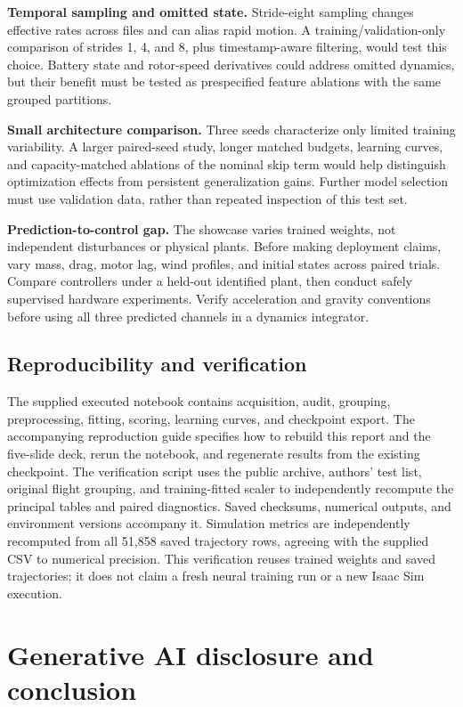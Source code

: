 \documentclass[10pt,letterpaper]{article}
\begin{document}
\textbf{Temporal sampling and omitted state.} Stride-eight sampling changes effective rates across files and can alias rapid motion. A training/validation-only comparison of strides 1, 4, and 8, plus timestamp-aware filtering, would test this choice. Battery state and rotor-speed derivatives could address omitted dynamics, but their benefit must be tested as prespecified feature ablations with the same grouped partitions.

\textbf{Small architecture comparison.} Three seeds characterize only limited training variability. A larger paired-seed study, longer matched budgets, learning curves, and capacity-matched ablations of the nominal skip term would help distinguish optimization effects from persistent generalization gains. Further model selection must use validation data, rather than repeated inspection of this test set.

\textbf{Prediction-to-control gap.} The showcase varies trained weights, not independent disturbances or physical plants. Before making deployment claims, vary mass, drag, motor lag, wind profiles, and initial states across paired trials. Compare controllers under a held-out identified plant, then conduct safely supervised hardware experiments. Verify acceleration and gravity conventions before using all three predicted channels in a dynamics integrator.

\subsection{Reproducibility and verification}
The supplied executed notebook contains acquisition, audit, grouping, preprocessing, fitting, scoring, learning curves, and checkpoint export. The accompanying reproduction guide specifies how to rebuild this report and the five-slide deck, rerun the notebook, and regenerate results from the existing checkpoint. The verification script uses the public archive, authors' test list, original flight grouping, and training-fitted scaler to independently recompute the principal tables and paired diagnostics. Saved checksums, numerical outputs, and environment versions accompany it. Simulation metrics are independently recomputed from all 51,858 saved trajectory rows, agreeing with the supplied CSV to numerical precision. This verification reuses trained weights and saved trajectories; it does not claim a fresh neural training run or a new Isaac Sim execution.

\clearpage
\section{Generative AI disclosure and conclusion}
\end{document}
